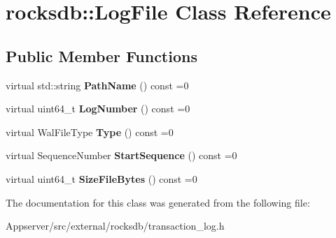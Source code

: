 \hypertarget{classrocksdb_1_1LogFile}{}\section{rocksdb\+:\+:Log\+File Class Reference}
\label{classrocksdb_1_1LogFile}
\subsection*{Public Member Functions}
\begin{DoxyCompactItemize}
\item 
virtual std\+::string {\bfseries Path\+Name} () const =0\hypertarget{classrocksdb_1_1LogFile_ad420284dff771d305a7ddbef2a9cdf78}{}\label{classrocksdb_1_1LogFile_ad420284dff771d305a7ddbef2a9cdf78}

\item 
virtual uint64\+\_\+t {\bfseries Log\+Number} () const =0\hypertarget{classrocksdb_1_1LogFile_ac512eef738c0f09c8f019607937e2153}{}\label{classrocksdb_1_1LogFile_ac512eef738c0f09c8f019607937e2153}

\item 
virtual Wal\+File\+Type {\bfseries Type} () const =0\hypertarget{classrocksdb_1_1LogFile_a680e4dd110f67560c473f4a8f66a595f}{}\label{classrocksdb_1_1LogFile_a680e4dd110f67560c473f4a8f66a595f}

\item 
virtual Sequence\+Number {\bfseries Start\+Sequence} () const =0\hypertarget{classrocksdb_1_1LogFile_a2d08d4f965651f916792ca6191f5a1b6}{}\label{classrocksdb_1_1LogFile_a2d08d4f965651f916792ca6191f5a1b6}

\item 
virtual uint64\+\_\+t {\bfseries Size\+File\+Bytes} () const =0\hypertarget{classrocksdb_1_1LogFile_a383bf764f3a5b506089cc585089163fc}{}\label{classrocksdb_1_1LogFile_a383bf764f3a5b506089cc585089163fc}

\end{DoxyCompactItemize}


The documentation for this class was generated from the following file\+:\begin{DoxyCompactItemize}
\item 
Appserver/src/external/rocksdb/transaction\+\_\+log.\+h\end{DoxyCompactItemize}
